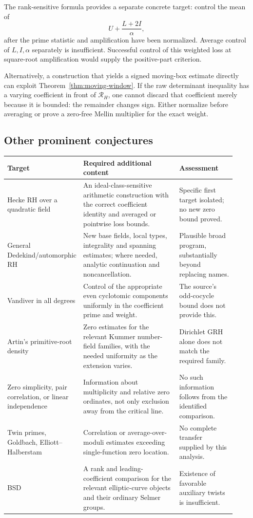 The rank-sensitive formula provides a separate concrete target:
control the mean of
\[
 U+\frac{L+2I}{\alpha},
\]
after the prime statistic and amplification have been normalized.
Average control of $L,I,\alpha$ separately is insufficient.
Successful control of this weighted loss at square-root
amplification would supply the positive-part criterion.

Alternatively, a construction that yields a signed moving-box
estimate directly can exploit Theorem~\ref{thm:moving-window}.
If the raw determinant inequality has a varying coefficient in
front of $\mathcal R_H$, one cannot discard that coefficient
merely because it is bounded: the remainder changes sign.
Either normalize before averaging or prove a zero-free
Mellin multiplier for the exact weight.

\subsection{Other prominent conjectures}

\begin{longtable}{@{}P{0.25\linewidth}P{0.43\linewidth}P{0.25\linewidth}@{}}
\toprule
Target & Required additional content & Assessment\\
\midrule
\endhead
Hecke RH over a quadratic field &
An ideal-class-sensitive arithmetic construction with the correct
coefficient identity and averaged or pointwise loss bounds. &
Specific first target isolated; no new zero bound proved.\\[5pt]
General Dedekind/automorphic RH &
New base fields, local types, integrality and spanning estimates;
where needed, analytic continuation and noncancellation. &
Plausible broad program, substantially beyond replacing names.\\[5pt]
Vandiver in all degrees &
Control of the appropriate even cyclotomic components uniformly
in the coefficient prime and weight. &
The source's odd-cocycle bound does not provide this.\\[5pt]
Artin's primitive-root density &
Zero estimates for the relevant Kummer number-field families,
with the needed uniformity as the extension varies. &
Dirichlet GRH alone does not match the required family.\\[5pt]
Zero simplicity, pair correlation, or linear independence &
Information about multiplicity and relative zero ordinates,
not only exclusion away from the critical line. &
No such information follows from the identified comparison.\\[5pt]
Twin primes, Goldbach, Elliott--Halberstam &
Correlation or average-over-moduli estimates exceeding
single-function zero location. &
No complete transfer supplied by this analysis.\\[5pt]
BSD &
A rank and leading-coefficient comparison for the relevant
elliptic-curve objects and their ordinary Selmer groups. &
Existence of favorable auxiliary twists is insufficient.\\
\bottomrule
\end{longtable}

